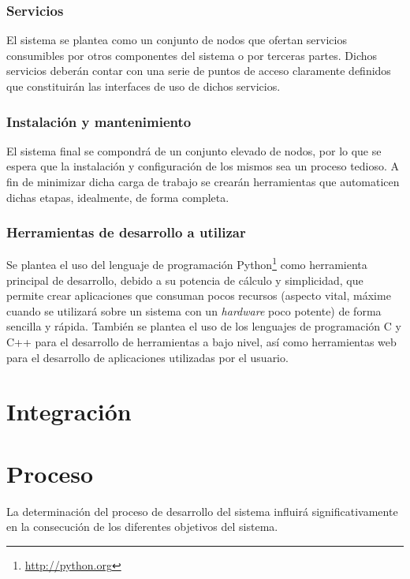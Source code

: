 \subsubsection{Servicios}

El sistema se plantea como un conjunto de nodos que ofertan servicios consumibles por otros componentes del sistema o por terceras partes. Dichos servicios deberán contar con una serie de puntos de acceso claramente definidos que constituirán las interfaces de uso de dichos servicios.

\subsubsection{Instalación y mantenimiento}

El sistema final se compondrá de un conjunto elevado de nodos, por lo que se espera que la instalación y configuración de los mismos sea un proceso tedioso. A fin de minimizar dicha carga de trabajo se crearán herramientas que automaticen dichas etapas, idealmente, de forma completa.

\subsubsection{Herramientas de desarrollo a utilizar}

Se plantea el uso del lenguaje de programación Python\footnote{\href{http://www.python.org}{http://python.org}} como herramienta principal de desarrollo, debido a su potencia de cálculo y simplicidad, que permite crear aplicaciones que consuman pocos recursos (aspecto vital, máxime cuando se utilizará sobre un sistema con un \textit{hardware} poco potente) de forma sencilla y rápida. También se plantea el uso de los lenguajes de programación C y C++ para el desarrollo de herramientas a bajo nivel, así como herramientas web para el desarrollo de aplicaciones utilizadas por el usuario.

\section{Integración}

\section{Proceso}

La determinación del proceso de desarrollo del sistema influirá significativamente en la consecución de los diferentes objetivos del sistema.

